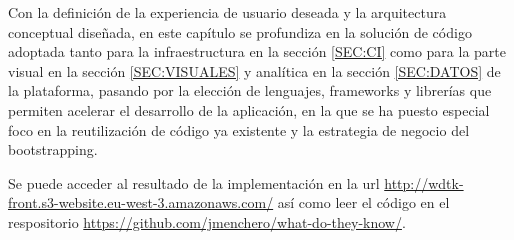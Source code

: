 
Con la definición de la experiencia de usuario deseada y la arquitectura conceptual diseñada, en este capítulo se profundiza en la solución de código adoptada tanto para la infraestructura en la sección \ref{SEC:CI} como para la parte visual en la sección \ref{SEC:VISUALES} y analítica en la sección \ref{SEC:DATOS} de la plataforma, pasando por la elección de lenguajes, frameworks y librerías que permiten acelerar el desarrollo de la aplicación, en la que se ha puesto especial foco en la reutilización de código ya existente y la estrategia de negocio del bootstrapping\cite{Bootstrapping}.

Se puede acceder al resultado de la implementación en la url \url{http://wdtk-front.s3-website.eu-west-3.amazonaws.com/} así como leer el código en el respositorio \url{https://github.com/jmenchero/what-do-they-know/}. 
